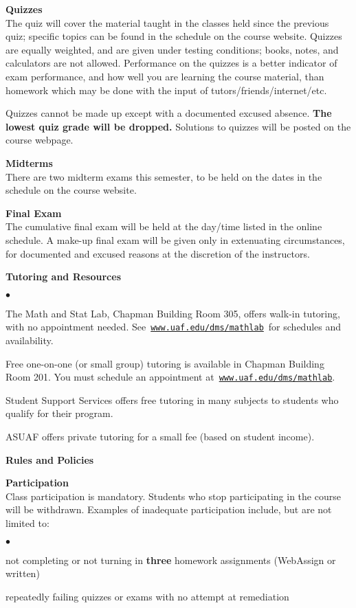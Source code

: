 \documentclass[12pt]{article}
\renewcommand{\emph}[1]{\textsf{\textbf{#1}}}
\newcommand{\localhead}[1]{\par\smallskip\textbf{#1}\nobreak\\}%
\def\heading#1{\localhead{\large\emph{#1}}}
\def\subheading#1{\localhead{\emph{#1}}}
\newenvironment{clist}%
{\bgroup\parskip 0pt\begin{list}{$\bullet$}{\partopsep 4pt\topsep 0pt\itemsep -2pt}}%
{\end{list}\egroup}%
\begin{document}
\heading{Quizzes}
The quiz will cover the material taught in the classes held since the previous quiz; specific topics can be found in the schedule on the course website.  Quizzes are equally weighted, and are given under testing conditions; books, notes, and calculators are not allowed.  Performance on the quizzes is a better indicator of exam performance, and how well you are learning the course material, than homework which may be done with the input of tutors/friends/internet/etc.

Quizzes cannot be made up except with a documented excused absence.  \emph{The lowest quiz grade will be dropped.}  Solutions to quizzes will be posted on the course webpage.


\heading{Midterms}
There are two midterm exams this semester, to be held on the dates in the schedule on the course website.


\heading{Final Exam}
The cumulative final exam will be held at the day/time listed in the online schedule. A make-up final exam will be given only in extenuating circumstances, for documented and excused reasons at the discretion of the instructors.


\heading{Tutoring and Resources}
\vskip -30pt\strut
\begin{clist}
	\item The Math and Stat Lab, Chapman Building Room 305, offers walk-in tutoring, with no appointment needed.  See\, \href{http://www.uaf.edu/dms/mathlab/}{\texttt{www.uaf.edu/dms/mathlab}}\, for schedules and availability.
	\item Free one-on-one (or small group) tutoring is available in Chapman Building Room 201. You must schedule an appointment at\, \href{http://www.uaf.edu/dms/mathlab/}{\texttt{www.uaf.edu/dms/mathlab}}.
	\item Student Support Services offers free tutoring in many subjects to students who qualify for their program.
	\item ASUAF offers private tutoring for a small fee (based on student income).
\end{clist}


\heading{Rules and Policies}
\vskip -20pt
\subheading{Participation}
Class participation is mandatory.  Students who stop participating in the course will be withdrawn.  Examples of inadequate participation include, but are not limited to:

\begin{clist}
\item not completing or not turning in \textbf{three} homework assignments (WebAssign or written)
\item repeatedly failing quizzes or exams with no attempt at remediation
\end{clist}
\end{document}
